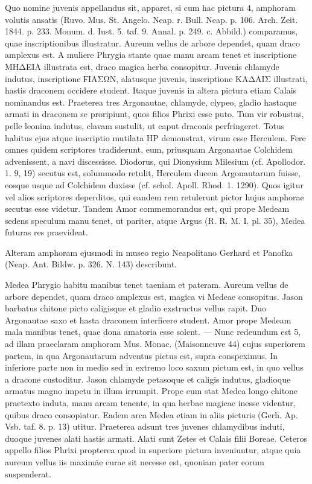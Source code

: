 \documentclass[a4paper, 11pt, oneside, polutonikogreek, german]{article}
\begin{document}
Quo nomine juvenis appellandus sit, apparet, si cum hac pictura 4, amphoram volutis ansatis (Ruvo. Mus. St. Angelo. Neap. r. Bull. Neap. p. 106. Arch. Zeit. 1844. p. 233. Monum. d. Iust. 5. taf. 9. Annal. p. 249. c. Abbild.) comparamus, quae inscriptionibus illustratur. Aureum vellus de arbore dependet, quam draco amplexus est. A muliere Phrygia stante quae manu arcam tenet et inscriptione ΜΗΔΕΙΑ illustrata est, draco magica herba consopitur. Juvenis chlamyde indutus, inscriptione ϜΙΑΣΩΝ, alatusque juvenis, inscriptione ΚΑΔΑΙΣ illustrati, hastis draconem occidere student. Itaque juvenis in altera pictura etiam Calais nominandus est. Praeterea tres Argonautae, chlamyde, clypeo, gladio hastaque armati in draconem se proripiunt, quos filios Phrixi esse puto. Tum vir robustus, pelle leonina indutus, clavam sustulit, ut caput draconis perfringeret. Totus habitus ejus atque inscriptio mutilata ΗΡ demonstrat, virum esse Herculem. Fere omnes quidem scriptores tradiderunt, eum, priusquam Argonautae Colchidem advenissent, a navi discessisse. Diodorus, qui Dionysium Milesium (cf. Apollodor. 1. 9, 19) secutus est, solummodo retulit, Herculem ducem Argonautarum fuisse, eosque usque ad Colchidem duxisse (cf. schol. Apoll. Rhod. 1. 1290). Quos igitur vel alios scriptores deperditos, qui eandem rem retulerunt pictor hujus amphorae secutus esse videtur. Tandem Amor commemorandus est, qui prope Medeam sedens speculum manu tenet, ut pariter, atque Argus (R. R. M. I. pl. 35), Medea futuras res praevideat.

Alteram amphoram ejusmodi in museo regio Neapolitano Gerhard et Panofka (Neap. Ant. Bildw. p. 326. N. 143) describunt.

Medea Phrygio habitu manibus tenet taeniam et pateram. Aureum vellus de arbore dependet, quam draco amplexus est, magica vi Medeae consopitus. Jason barbatus chitone picto caligisque et gladio exstructus vellus rapit. Duo Argonautae saxo et hasta draconem interficere student. Amor prope Medeam mala manibus tenet, quae dona amatoria esse solent. --- Nunc redeundum est 5, ad illam praeclaram amphoram Mus. Monac. (Maisonneuve 44) cujus superiorem partem, in qua Argonautarum adventus pictus est, supra conspeximus. In inferiore parte non in medio sed in extremo loco saxum pictum est, in quo vellus a dracone custoditur. Jason chlamyde petasoque et caligis indutus, gladioque armatus magno impetu in illum irrumpit. Prope eum stat Medea longo chitone praetexto induta, manu arcam tenente, in qua herbae magicae inesse videntur, quibus draco consopiatur. Eadem arca Medea etiam in aliis picturis (Gerh. Ap. Vsb. taf. 8. p. 13) utitur. Praeterea adsunt tres juvenes chlamydibus induti, duoque juvenes alati hastis armati. Alati sunt Zetes et Calais filii Boreae. Ceteros appello filios Phrixi propterea quod in superiore pictura inveniuntur, atque quia aureum vellus iis maximäe curae sit necesse est, quoniam pater eorum suspenderat.
\end{document}
